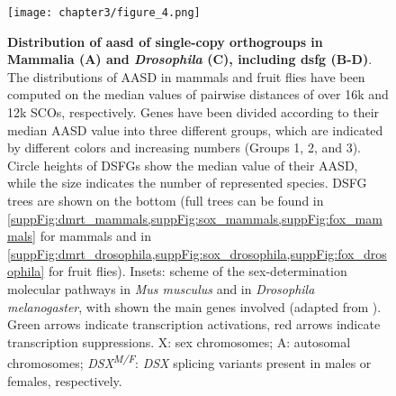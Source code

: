\begin{figure}
	\centering
	\texttt{[image: chapter3/figure\_4.png]}
	\captionsetup[subfigure]{labelformat=nocaption}
	\begin{subfigure}{0\linewidth}
	\caption{}\label{fig:DSFG_testDivergence-A}
	\end{subfigure}%
	\begin{subfigure}{0\linewidth}
	\caption{}\label{fig:DSFG_testDivergence-B}
	\end{subfigure}%
	\begin{subfigure}{0\linewidth}
	\caption{}\label{fig:DSFG_testDivergence-C}
	\end{subfigure}%
	\begin{subfigure}{0\linewidth}
	\caption{}\label{fig:DSFG_testDivergence-D}
	\end{subfigure}
	
	\caption[\textbf{Distribution of \gls{aasd} of single-copy orthogroups in Mammalia (A) and \textit{Drosophila} (C), including \gls{dsfg} (B-D)}]
	{
		\textbf{Distribution of \gls{aasd} of single-copy orthogroups in Mammalia (A) and \textit{Drosophila} (C), including \gls{dsfg} (B-D)}. The distributions of AASD in mammals and fruit flies have been computed on the median values of pairwise distances of over 16k and 12k SCOs, respectively. Genes have been divided according to their median AASD value into three different groups, which are indicated by different colors and increasing numbers (Groups 1, 2, and 3). Circle heights of DSFGs show the median value of their AASD, while the size indicates the number of represented species. DSFG trees are shown on the bottom (full trees can be found in \cref{suppFig:dmrt_mammals,suppFig:sox_mammals,suppFig:fox_mammals} for mammals and in \cref{suppFig:dmrt_drosophila,suppFig:sox_drosophila,suppFig:fox_drosophila} for fruit flies). Insets: scheme of the sex-determination molecular pathways in \textit{Mus musculus} and in \textit{Drosophila melanogaster}, with shown the main genes involved (adapted from \textbf{\cite{beukeboom2014evolution}}). Green arrows indicate transcription activations, red arrows indicate transcription suppressions. X: sex chromosomes; A: autosomal chromosomes; \textit{DSX\textsuperscript{M/F}}: \textit{DSX} splicing variants present in males or females, respectively.
	}
	\label{fig:DSFG_testDivergence}
\end{figure}

